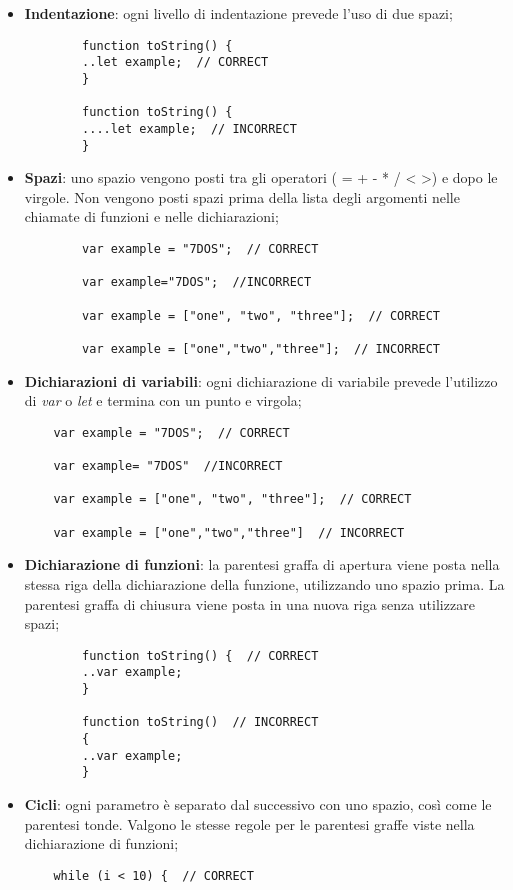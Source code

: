\begin{itemize}
	\item{\textbf{Indentazione}}: ogni livello di indentazione prevede l'uso di due spazi;
	\begin{lstlisting}
		function toString() {
		..let example;  // CORRECT
		}
		
		function toString() {
		....let example;  // INCORRECT
		}
	\end{lstlisting}
	 
	\item{\textbf{Spazi}: uno spazio vengono posti tra gli operatori ( = + - * / < >) e dopo le virgole. Non vengono posti spazi prima della lista degli argomenti nelle chiamate di funzioni e nelle dichiarazioni;}
	\begin{lstlisting}
		var example = "7DOS";  // CORRECT
		
		var example="7DOS";  //INCORRECT
		
		var example = ["one", "two", "three"];  // CORRECT
		
		var example = ["one","two","three"];  // INCORRECT
	\end{lstlisting}
	
	\item{\textbf{Dichiarazioni di variabili}: ogni dichiarazione di variabile prevede l'utilizzo di \emph{var} o \emph{let} e termina con un punto e virgola;}
	\begin{lstlisting}
	var example = "7DOS";  // CORRECT
	
	var example= "7DOS"  //INCORRECT
	
	var example = ["one", "two", "three"];  // CORRECT
	
	var example = ["one","two","three"]  // INCORRECT
	\end{lstlisting}
	
	\item{\textbf{Dichiarazione di funzioni}: la parentesi graffa di apertura viene posta nella stessa riga della dichiarazione della funzione, utilizzando uno spazio prima. La parentesi graffa di chiusura viene posta in una nuova riga senza utilizzare spazi;}
	\begin{lstlisting}
		function toString() {  // CORRECT
		..var example;
		}
		
		function toString()  // INCORRECT
		{  
		..var example;
		}
	\end{lstlisting}
	
	\item{\textbf{Cicli}: ogni parametro è separato dal successivo con uno spazio, così come le parentesi tonde. Valgono le stesse regole per le parentesi graffe viste nella dichiarazione di funzioni;
	\begin{lstlisting}
	while (i < 10) {  // CORRECT
	

\end{lstlisting}}
\end{itemize}
